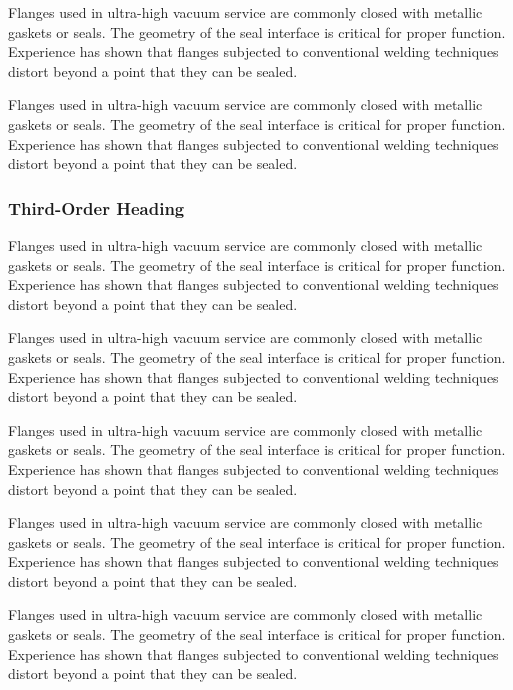 \documentclass[11pt,letterpaper,twoside,english,final]{article}
\begin{document}
{Flanges used in ultra-high vacuum service are commonly closed with metallic gaskets or seals. The geometry of the seal interface is critical for proper function. Experience has shown that flanges subjected to conventional welding techniques distort beyond a point that they can be sealed.

Flanges used in ultra-high vacuum service are commonly closed with metallic gaskets or seals. The geometry of the seal interface is critical for proper function. Experience has shown that flanges subjected to conventional welding techniques distort beyond a point that they can be sealed.

\subsubsection{Third-Order Heading}

Flanges used in ultra-high vacuum service are commonly closed with metallic gaskets or seals. The geometry of the seal interface is critical for proper function. Experience has shown that flanges subjected to conventional welding techniques distort beyond a point that they can be sealed.

Flanges used in ultra-high vacuum service are commonly closed with metallic gaskets or seals. The geometry of the seal interface is critical for proper function. Experience has shown that flanges subjected to conventional welding techniques distort beyond a point that they can be sealed.

Flanges used in ultra-high vacuum service are commonly closed with metallic gaskets or seals. The geometry of the seal interface is critical for proper function. Experience has shown that flanges subjected to conventional welding techniques distort beyond a point that they can be sealed.


Flanges used in ultra-high vacuum service are commonly closed with metallic gaskets or seals. The geometry of the seal interface is critical for proper function. Experience has shown that flanges subjected to conventional welding techniques distort beyond a point that they can be sealed.

Flanges used in ultra-high vacuum service are commonly closed with metallic gaskets or seals. The geometry of the seal interface is critical for proper function. Experience has shown that flanges subjected to conventional welding techniques distort beyond a point that they can be sealed.

}
\end{document}
